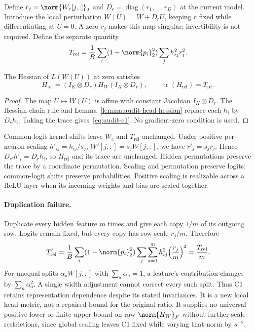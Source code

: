 Define $r_j=\norm{W_c[j,:]}_2$ and $D_r=\operatorname{diag}(r_1,\ldots,r_D)$ at the current model. Introduce the local perturbation $W(U)=W+D_r U$, keeping $r$ fixed while differentiating at $U=0$. A zero $r_j$ makes this map singular; invertibility is not required. Define the separate quantity
\begin{equation}
    T_{\mathrm{rel}}=\frac{1}{B}\sum_i(1-\norm{p_i}_2^2)
    \sum_j h_{ij}^2 r_j^2.
    \label{eq:audit-c1}
\end{equation}

\begin{lemma}%
\label{lemma:audit-relative-head}
The Hessian of $L(W(U))$ at zero satisfies
\begin{equation}
    H_{\mathrm{rel}}=(I_K\otimes D_r)H_W(I_K\otimes D_r),\qquad
    \operatorname{tr}(H_{\mathrm{rel}})=T_{\mathrm{rel}}.
\end{equation}
\end{lemma}
\begin{proof}
The map $U\mapsto W(U)$ is affine with constant Jacobian $I_K\otimes D_r$. The Hessian chain rule and Lemma~\ref{lemma:audit-head-hessian} replace each $h_i$ by $D_r h_i$. Taking the trace gives~\eqref{eq:audit-c1}. No gradient-zero condition is used.
\end{proof}

Common-logit kernel shifts leave $W_c$ and $T_{\mathrm{rel}}$ unchanged. Under positive per-neuron scaling $h'_{ij}=h_{ij}/s_j$, $W'[j,:]=s_j W[j,:]$, we have $r'_j=s_j r_j$. Hence $D_{r'}h'_i=D_r h_i$, so $H_{\mathrm{rel}}$ and its trace are unchanged. Hidden permutations preserve the trace by a coordinate permutation. Scaling and permutation preserve logits; common-logit shifts preserve probabilities. Positive scaling is realizable across a ReLU layer when its incoming weights and bias are scaled together.

\paragraph{Duplication failure.}
Duplicate every hidden feature $m$ times and give each copy $1/m$ of its outgoing row. Logits remain fixed, but every copy has row scale $r_j/m$. Therefore
\begin{equation}
    T'_{\mathrm{rel}}=\frac{1}{B}\sum_i(1-\norm{p_i}_2^2)
    \sum_j\sum_{a=1}^m h_{ij}^2{\left(\frac{r_j}{m}\right)}^2
    =\frac{T_{\mathrm{rel}}}{m}.
\end{equation}
For unequal splits $\alpha_a W[j,:]$ with $\sum_a\alpha_a=1$, a feature's contribution changes by $\sum_a\alpha_a^2$. A single width adjustment cannot correct every such split. Thus C1 retains representation dependence despite its stated invariances. It is a new local head metric, not a repaired bound for the original ratio. It supplies no universal positive lower or finite upper bound on raw $\norm{H_W}_F$ without further scale restrictions, since global scaling leaves C1 fixed while varying that norm by $s^{-2}$.

